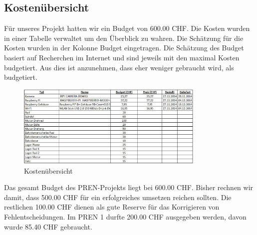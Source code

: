 

\subsection{Kostenübersicht}
Für unseres Projekt hatten wir ein Budget von 600.00 CHF. Die Kosten
wurden in einer Tabelle verwaltet um den Überblick zu wahren. Die
Schätzung für die Kosten wurden in der Kolonne Budget eingetragen. Die
Schätzung des Budget basiert auf Recherchen im Internet und sind jeweils
mit den maximal Kosten budgetiert. Aus dies ist anzunehmen, dass eher
weniger gebraucht wird, als budgetiert.

\begin{figure}[h!]
	\center
	\includegraphics[width=0.8\textwidth]{../../fig/Kostenuebersicht.jpg}
	\caption{Kostenübersicht}
	\label{fig:Kostenuebersicht}
\end{figure}

Das gesamt Budget des PREN-Projekts liegt bei 600.00 CHF. Bisher rechnen
wir damit, dass 500.00 CHF für ein erfolgreiches umsetzen reichen sollten.
Die restlichen 100.00 CHF dienen als gute Reserve für das Korrigieren von
Fehlentscheidungen. Im PREN 1 durfte 200.00 CHF ausgegeben werden, davon
wurde 85.40 CHF gebraucht. 

\newpage







